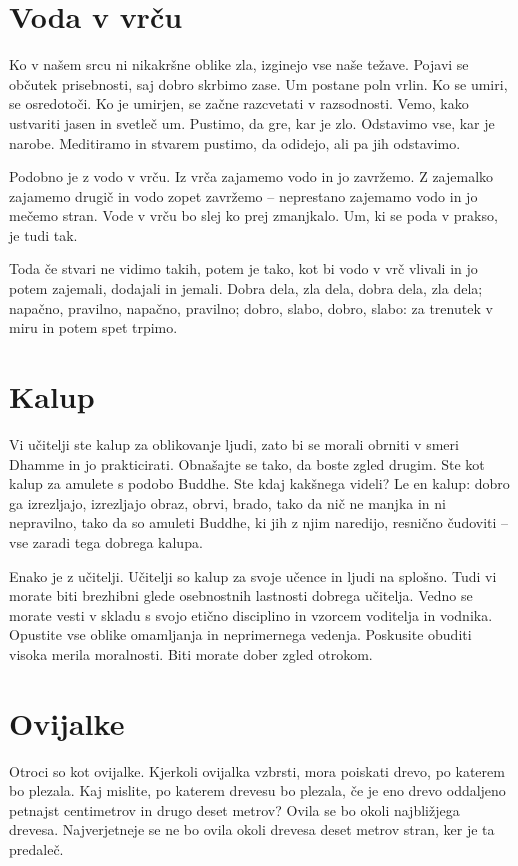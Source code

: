 \section{Voda v vrču}

Ko v našem srcu ni nikakršne oblike zla, izginejo vse naše težave. Pojavi se občutek prisebnosti, saj dobro skrbimo zase. Um postane poln vrlin. Ko se umiri, se osredotoči. Ko je umirjen, se začne razcvetati v razsodnosti. Vemo, kako ustvariti jasen in svetleč um. Pustimo, da gre, kar je zlo. Odstavimo vse, kar je narobe. Meditiramo in stvarem pustimo, da odidejo, ali pa jih odstavimo.

Podobno je z vodo v vrču. Iz vrča zajamemo vodo in jo zavržemo. Z zajemalko zajamemo drugič in vodo zopet zavržemo – neprestano zajemamo vodo in jo mečemo stran. Vode v vrču bo slej ko prej zmanjkalo. Um, ki se poda v prakso, je tudi tak.

Toda če stvari ne vidimo takih, potem je tako, kot bi vodo v vrč vlivali in jo potem zajemali, dodajali in jemali. Dobra dela, zla dela, dobra dela, zla dela; napačno, pravilno, napačno, pravilno; dobro, slabo, dobro, slabo: za trenutek v miru in potem spet trpimo.

\section{Kalup}

Vi učitelji ste kalup za oblikovanje ljudi, zato bi se morali obrniti v smeri Dhamme in jo prakticirati. Obnašajte se tako, da boste zgled drugim. Ste kot kalup za amulete s podobo Buddhe. Ste kdaj kakšnega videli? Le en kalup: dobro ga izrezljajo, izrezljajo obraz, obrvi, brado, tako da nič ne manjka in ni nepravilno, tako da so amuleti Buddhe, ki jih z njim naredijo, resnično čudoviti – vse zaradi tega dobrega kalupa.

Enako je z učitelji. Učitelji so kalup za svoje učence in ljudi na splošno. Tudi vi morate biti brezhibni glede osebnostnih lastnosti dobrega učitelja. Vedno se morate vesti v skladu s svojo etično disciplino in vzorcem voditelja in vodnika. Opustite vse oblike omamljanja in neprimernega vedenja. Poskusite obuditi visoka merila moralnosti. Biti morate dober zgled otrokom.

\section{Ovijalke}

Otroci so kot ovijalke. Kjerkoli ovijalka vzbrsti, mora poiskati drevo, po katerem bo plezala. Kaj mislite, po katerem drevesu bo plezala, če je eno drevo oddaljeno petnajst centimetrov in drugo deset metrov? Ovila se bo okoli najbližjega drevesa. Najverjetneje se ne bo ovila okoli drevesa deset metrov stran, ker je ta predaleč.


